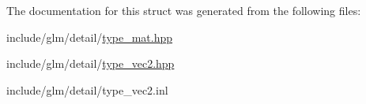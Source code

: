 The documentation for this struct was generated from the following files\+:\begin{DoxyCompactItemize}
\item 
include/glm/detail/\hyperlink{type__mat_8hpp}{type\+\_\+mat.\+hpp}\item 
include/glm/detail/\hyperlink{type__vec2_8hpp}{type\+\_\+vec2.\+hpp}\item 
include/glm/detail/type\+\_\+vec2.\+inl\end{DoxyCompactItemize}
